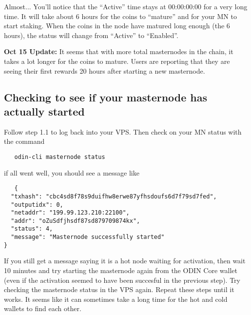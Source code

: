 \documentclass[rmp,12pt,notitlepage]{revtex4-1}
\begin{document}
Almost...
You'll notice that the ``Active'' time stays at 00:00:00:00 for a very long time.  It will take about 6 hours for the coins to ``mature'' and for your MN to start staking.  When the coins in the node have matured long enough (the 6 hours), the status will change from ``Active'' to ``Enabled''.

\textbf{Oct 15 Update:} It seems that with more total masternodes in the chain, it takes a lot longer for the coins to mature.  Users are reporting that they are seeing their first rewards 20 hours after starting a new masternode.

\subsection{Checking to see if your masternode has actually started}
Follow step 1.1 to log back into your VPS.  Then check on your MN status with the command
\begin{verbatim}
   odin-cli masternode status
\end{verbatim}
if all went well, you should see a message like
\begin{verbatim}
   {
  "txhash": "cbc4sd8f78s9duifhw8erwe87yfhsdoufs6d7f79sd7fed",
  "outputidx": 0,
  "netaddr": "199.99.123.210:22100",
  "addr": "oZuSdfjhsdf87sd879709874kx",
  "status": 4,
  "message": "Masternode successfully started"
}
\end{verbatim}
If you still get a message saying it is a hot node waiting for activation, then wait 10 minutes and try starting the masternode again from the ODIN Core wallet (even if the activation seemed to have been succesful in the previous step).  Try checking the masternode status in the VPS again.  Repeat these steps until it works.  It seems like it can sometimes take a long time for the hot and cold wallets to find each other.  
\end{document}
